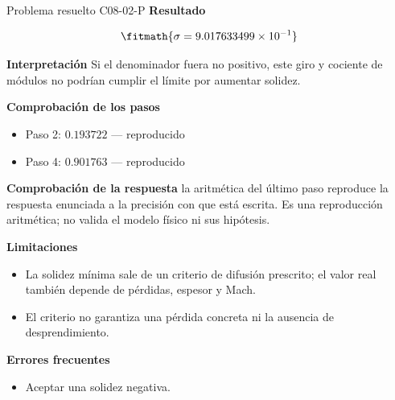 \documentclass[10pt,openany]{book}
\begin{document}
\begin{studiumworked}{Problema resuelto C08-02-P}
\noindent\textbf{Resultado}

\[
\fitmath{\sigma=9.017633499\times10^{-1}}
\]

\noindent\textbf{Interpretación}
Si el denominador fuera no positivo, este giro y cociente de módulos no podrían cumplir el límite por aumentar solidez.

\noindent\textbf{Comprobación de los pasos}
\begin{itemize}
\item Paso 2: $0.193722$ — reproducido
\item Paso 4: $0.901763$ — reproducido
\end{itemize}

\noindent\textbf{Comprobación de la respuesta} la aritmética del último paso reproduce la respuesta enunciada a la precisión con que está escrita. Es una reproducción aritmética; no valida el modelo físico ni sus hipótesis.

\noindent\textbf{Limitaciones}
\begin{itemize}
\item La solidez mínima sale de un criterio de difusión prescrito; el valor real también depende de pérdidas, espesor y Mach.
\item El criterio no garantiza una pérdida concreta ni la ausencia de desprendimiento.
\end{itemize}

\noindent\textbf{Errores frecuentes}
\begin{itemize}
\item Aceptar una solidez negativa.
\end{itemize}
\end{studiumworked}
\end{document}
